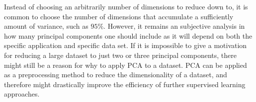 Instead of choosing an arbitrarily number of dimensions to reduce down to, it is common to choose the number of dimensions that accumulate a sufficiently amount of variance, such as $95 \%$. However, it remains an subjective analysis in how many principal components  one should include as it will depend on both the specific application and specific data set. If it is impossible to give a motivation for reducing a large dataset to just two or three principal components, there might still be a reason for why to apply PCA to a dataset. PCA can be applied as a preprocessing method to reduce the dimensionality of a dataset, and therefore might drastically improve the efficiency of further supervised learning approaches.

